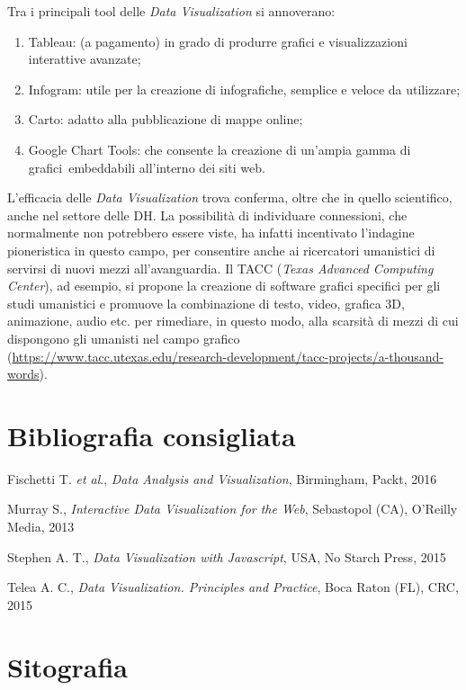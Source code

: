 \documentclass[
  b5paper,
  twoside,
  12pt,
  chapterprefix=false,
  bibliography=totocnumbered,
  parskip=false]{scrbook}
\begin{document}
Tra i principali tool delle \emph{Data Visualization} si annoverano:

\begin{enumerate}
\def\labelenumi{\arabic{enumi}.}
\item
  Tableau: (a pagamento) in grado di produrre grafici e
  visualizzazioni interattive avanzate;
\item
  Infogram: utile per la creazione di infografiche, semplice e veloce
  da utilizzare;
\item
  Carto: adatto alla pubblicazione di mappe online;
\item
  Google Chart Tools: che consente la creazione di un'ampia gamma di
  grafici~embeddabili all'interno dei siti web.
\end{enumerate}

L'efficacia delle \emph{Data Visualization} trova conferma, oltre che in
quello scientifico, anche nel settore delle DH. La possibilità di
individuare connessioni, che normalmente non potrebbero essere viste, ha
infatti incentivato l'indagine pioneristica in questo campo, per
consentire anche ai ricercatori umanistici di servirsi di nuovi mezzi
all'avanguardia. Il TACC (\emph{Texas Advanced Computing Center}), ad
esempio, si propone la creazione di software grafici specifici per gli
studi umanistici e promuove la combinazione di testo, video, grafica 3D,
animazione, audio etc. per rimediare, in questo modo, alla scarsità di
mezzi di cui dispongono gli umanisti nel campo grafico
(\url{https://www.tacc.utexas.edu/research-development/tacc-projects/a-thousand-words}).

\hypertarget{bibliografia-consigliata-5}{%
\section*{Bibliografia consigliata}\label{bibliografia-consigliata-5}}

Fischetti T. \emph{et al}., \emph{Data Analysis and Visualization}, Birmingham,
Packt, 2016

Murray S., \emph{Interactive Data Visualization for the Web}, Sebastopol
(CA), O'Reilly Media, 2013

Stephen A. T., \emph{Data Visualization with Javascript}, USA, No Starch
Press, 2015

Telea A. C., \emph{Data Visualization. Principles and Practice}, Boca Raton
(FL), CRC, 2015

\hypertarget{sitografia-7}{%
\section*{Sitografia}\label{sitografia-7}}
\end{document}
